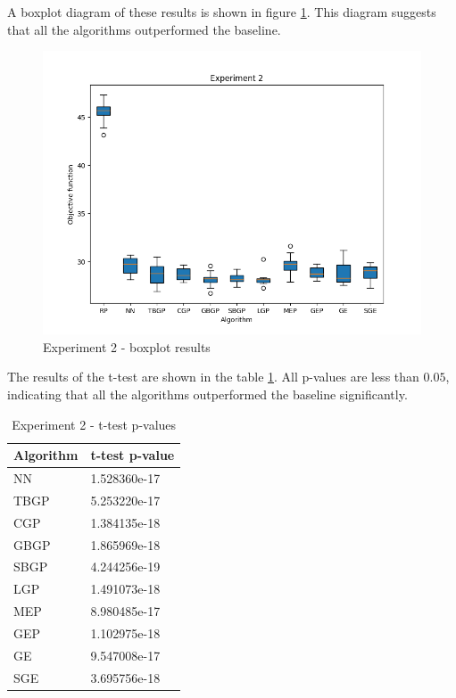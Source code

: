 A boxplot diagram of these results is shown in figure \ref{fig:experiment2}. This diagram suggests that all the algorithms outperformed the baseline.

\begin{figure}[!htbp]
    \centering
    \includegraphics[scale=0.7]{../images/experiment2.png}
    \caption{Experiment 2 - boxplot results}
    \label{fig:experiment2}
\end{figure}

The results of the t-test are shown in the table \ref{tab:experiment2_stat}. All p-values are less than $0.05$, indicating that all the algorithms outperformed the baseline significantly.
    
\begin{table}[!htbp]
    \begin{center}
        \begin{tabular}{|l|l|} 
         \hline
            Algorithm & t-test p-value \\ [0.5ex] \hline\hline
            NN & 1.528360e-17 \\
            \hline
            TBGP & 5.253220e-17 \\
            \hline
            CGP & 1.384135e-18 \\
            \hline
            GBGP & 1.865969e-18 \\
            \hline
            SBGP & 4.244256e-19 \\
            \hline
            LGP & 1.491073e-18 \\
            \hline
            MEP & 8.980485e-17 \\
            \hline
            GEP & 1.102975e-18 \\
            \hline
            GE & 9.547008e-17 \\
            \hline
            SGE & 3.695756e-18 \\
            \hline
        \end{tabular}
    \end{center}
    \caption{Experiment 2 - t-test p-values}
\label{tab:experiment2_stat}
\end{table}

